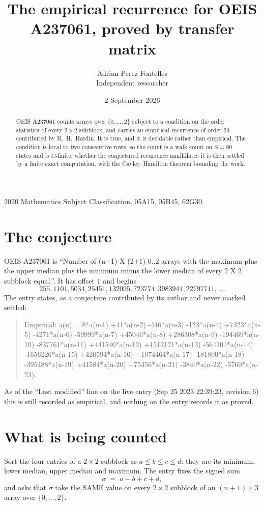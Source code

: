 \documentclass[11pt,a4paper]{article}
\title{The empirical recurrence for OEIS A237061, proved by transfer matrix}
\author{Adrian Perez Fontelles\\ \small Independent researcher}
\date{2 September 2026}
\theoremstyle{plain}
\theoremstyle{definition}
\begin{document}
\maketitle

\begin{abstract}
OEIS A237061 counts arrays over $\{0,\dots,2\}$ subject to a condition on the order
statistics of every $2\times2$ subblock, and carries an empirical recurrence of order
$23$ contributed by R.~H.~Hardin. It is true, and it is decidable rather than empirical.
The condition is local to two consecutive rows, so the count is a walk count on $S=80$
states and is $C$-finite; whether the conjectured recurrence annihilates it is then settled by
a finite exact computation, with the Cayley--Hamilton theorem bounding the work.
\end{abstract}

\noindent\small 2020 Mathematics Subject Classification. 05A15, 05B45, 62G30.\normalsize

\section{The conjecture}

OEIS A237061 is ``Number of (n+1) X (2+1) 0..2 arrays with the maximum plus the upper median plus the minimum minus the lower median of every 2 X 2 subblock equal.''. It has offset $1$ and begins
\[
255, 1101, 5034, 25451, 132095, 723774, 3983941, 22797711,\ \dots
\]
The entry states, as a conjecture contributed by its author and never marked settled:
\begin{quote}
Empirical: a(n) = 8*a(n-1) +41*a(n-2) -446*a(n-3) -123*a(n-4) +7323*a(n-5) -4271*a(n-6) -59999*a(n-7) +45046*a(n-8) +286308*a(n-9) -194469*a(n-10) -837761*a(n-11) +441540*a(n-12) +1512121*a(n-13) -564301*a(n-14) -1656226*a(n-15) +420594*a(n-16) +1074464*a(n-17) -181800*a(n-18) -395488*a(n-19) +41584*a(n-20) +75456*a(n-21) -3840*a(n-22) -5760*a(n-23).
\end{quote}
As of the ``Last modified'' line on the live entry (Sep 25 2023 22:39:23, revision 6) this is still
recorded as empirical, and nothing on the entry records it as proved.

\section{What is being counted}

Sort the four entries of a $2\times2$ subblock as $a\le b\le c\le d$: they
are its minimum, lower median, upper median and maximum. The entry fixes the signed sum
\[
\sigma\;=\;a-b+c+d,
\]
and asks that $\sigma$ take the SAME value on every $2\times2$ subblock of an
$(n+1)\times3$ array over $\{0,\dots,2\}$.
\end{document}
